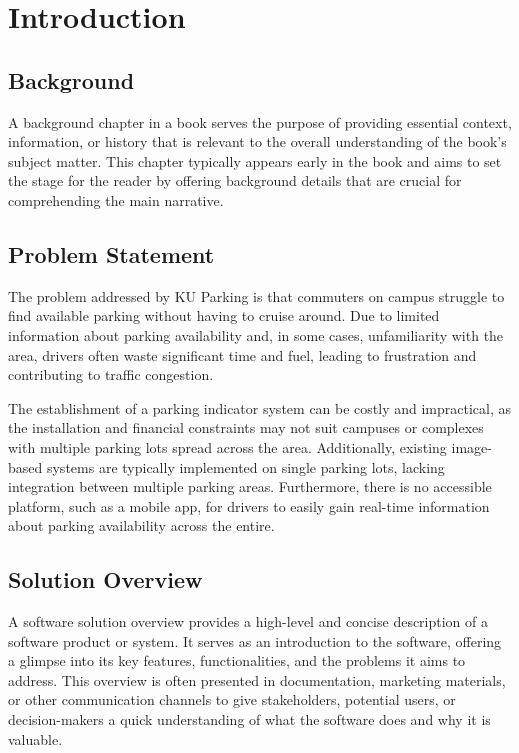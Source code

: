 \chapter{Introduction}
\label{chap:introduction}

\section{Background}
\label{section:background}

A background chapter in a book serves the purpose of providing essential context, information, or history that is relevant
to the overall understanding of the book's subject matter. This chapter typically appears early in the book and aims to set the
stage for the reader by offering background details that are crucial for comprehending the main narrative.

\section{Problem Statement}
\label{section:problem-statement}
The problem addressed by KU Parking is that commuters on campus struggle to find available parking without having to cruise around. Due to limited information about parking availability and, in some cases, unfamiliarity with the area, drivers often waste significant time and fuel, leading to frustration and contributing to traffic congestion. 

The establishment of a parking indicator system can be costly and impractical, as the installation and financial constraints may not suit campuses or complexes with multiple parking lots spread across the area. Additionally, existing image-based systems are typically implemented on single parking lots, lacking integration between multiple parking areas. Furthermore, there is no accessible platform, such as a mobile app, for drivers to easily gain real-time information about parking availability across the entire.

\section{Solution Overview}
\label{section:solution-overview}

A software solution overview provides a high-level and
concise description of a software product or system. It serves as an
introduction to the software, offering a glimpse into its key features,
functionalities, and the problems it aims to address. This overview is often
presented in documentation, marketing materials, or other communication
channels to give stakeholders, potential users, or decision-makers a quick
understanding of what the software does and why it is valuable.

